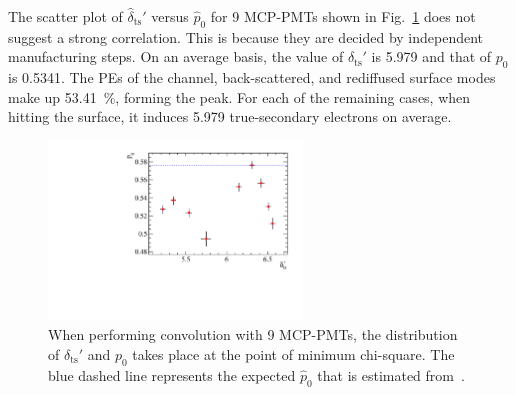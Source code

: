 The scatter plot of $\hat{\delta}_{\mathrm{ts}}'$ versus $\hat{p}_0$ for 9 MCP-PMTs shown in Fig.~\ref{fig:true_p} does not suggest a strong correlation. This is because they are decided by independent manufacturing steps. On an average basis, the value of $\delta_{\mathrm{ts}}'$ is 5.979 and that of $p_0$ is 0.5341. %
The PEs of the channel, back-scattered, and rediffused surface modes make up \SI{53.41}{\percent}, forming the peak. For each of the remaining cases, when hitting the surface, it induces 5.979 true-secondary electrons on average.
\begin{figure}[htbp]
	\centering
	\includegraphics[width=0.6\textwidth]{PMTRelated/GTmodel/true_p.pdf}
	\caption{When performing convolution with 9 MCP-PMTs, the distribution of $\delta_{\mathrm{ts}}'$ and $p_0$ takes place at the point of minimum chi-square. The blue dashed line represents the expected $\hat{p}_0$ that is estimated from~\cite{chen2018photoelectron}. }
	\label{fig:true_p}
\end{figure}

